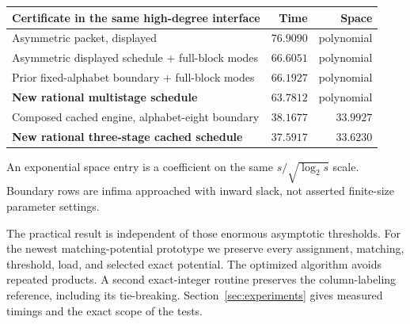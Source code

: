 \documentclass[11pt,letterpaper]{article}
\theoremstyle{remark}\newtheorem{remark}[theorem]{Remark}
\begin{document}
\begin{center}
\begin{tabular}{@{}p{}rr@{}}
\toprule
Certificate in the same high-degree interface & Time & Space\\
\midrule
Asymmetric packet, displayed & $76.9090$ & polynomial\\
Asymmetric displayed schedule + full-block modes & $66.6051$ & polynomial\\
Prior fixed-alphabet boundary + full-block modes & $66.1927$ & polynomial\\
\textbf{New rational multistage schedule} & $\mathbf{63.7812}$ & polynomial\\
Composed cached engine, alphabet-eight boundary & $38.1677$ & $33.9927$\\
\textbf{New rational three-stage cached schedule} & $\mathbf{37.5917}$ & $\mathbf{33.6230}$\\
\bottomrule
\end{tabular}
\end{center}
An exponential space entry is a coefficient on the same
$s/\sqrt{\log_2s}$ scale. Boundary rows are infima approached with inward
slack, not asserted finite-size parameter settings.

The practical result is independent of those enormous asymptotic thresholds.
For the newest matching-potential prototype we preserve every assignment,
matching, threshold, load, and selected exact potential. The optimized
algorithm avoids repeated products. A second exact-integer routine preserves
the column-labeling reference, including its tie-breaking. Section~\ref{sec:experiments}
gives measured timings and the exact scope of the tests.









\end{document}
